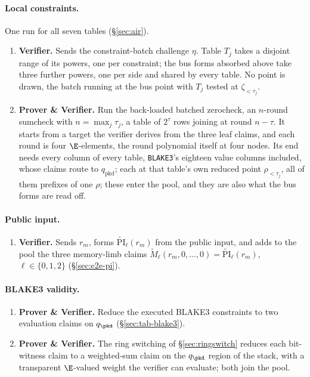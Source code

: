 \paragraph{Local constraints.} One run for all seven tables (\S\ref{sec:air}).
\begin{enumerate}
\item \textbf{Verifier.} Sends the constraint-batch challenge $\eta$. Table $T_j$ takes a disjoint range of its powers, one per constraint; the bus forms absorbed above take three further powers, one per side and shared by every table. No point is drawn, the batch running at the bus point with $T_j$ tested at $\zeta_{<\tau_j}$.
\item \textbf{Prover \& Verifier.} Run the back-loaded batched zerocheck, an $n$-round sumcheck with $n=\max_j\tau_j$, a table of $2^{\tau}$ rows joining at round $n-\tau$. It starts from a target the verifier derives from the three leaf claims, and each round is four $\E$-elements, the round polynomial itself at four nodes. Its end needs every column of every table, \texttt{BLAKE3}'s eighteen value columns included, whose claims route to $q_{\mathrm{pkd}}$; each at that table's own reduced point $\rho_{<\tau_j}$, all of them prefixes of one $\rho$; these enter the pool, and they are also what the bus forms are read off.
\end{enumerate}

\paragraph{Public input.}
\begin{enumerate}
\item \textbf{Verifier.} Sends $r_m$, forms $\widetilde{\mathrm{PI}}_\ell(r_m)$ from the public input, and adds to the pool the three memory-limb claims $\widetilde M_\ell(r_m,0,\dots,0)=\widetilde{\mathrm{PI}}_\ell(r_m)$, $\ell\in\{0,1,2\}$ (\S\ref{sec:e2e-pi}).
\end{enumerate}

\paragraph{BLAKE3 validity.}
\begin{enumerate}
\item \textbf{Prover \& Verifier.} Reduce the executed BLAKE3 constraints to two evaluation claims on $q_\pkd$ (\S\ref{sec:tab-blake3}).
\item \textbf{Prover \& Verifier.} The ring switching of \S\ref{sec:ringswitch} reduces each bit-witness claim to a weighted-sum claim on the $q_\pkd$ region of the stack, with a transparent $\E$-valued weight the verifier can evaluate; both join the pool.
\end{enumerate}

